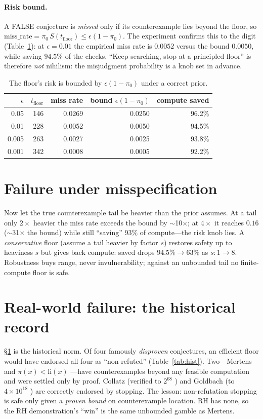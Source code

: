 \documentclass[11pt]{article}
\begin{document}
\paragraph{Risk bound.} A FALSE conjecture is \emph{missed} only if its
counterexample lies beyond the floor, so
$\mathrm{miss\_rate}=\pi_0\,S(t_{\mathrm{floor}})\le\epsilon(1-\pi_0)$. The
experiment confirms this to the digit (Table~\ref{tab:bound}): at $\epsilon=0.01$
the empirical miss rate is $0.0052$ versus the bound $0.0050$, while saving
$94.5\%$ of the checks. ``Keep searching, stop at a principled floor'' is therefore
\emph{not} nihilism: the misjudgment probability is a knob set in advance.

\begin{table}[h]\centering
\begin{tabular}{rrrrr}
\toprule
$\epsilon$ & $t_{\mathrm{floor}}$ & miss rate & bound $\epsilon(1-\pi_0)$ & compute saved\\
\midrule
0.05  & 146 & 0.0269 & 0.0250 & 96.2\%\\
0.01  & 228 & 0.0052 & 0.0050 & 94.5\%\\
0.005 & 263 & 0.0027 & 0.0025 & 93.8\%\\
0.001 & 342 & 0.0008 & 0.0005 & 92.2\%\\
\bottomrule
\end{tabular}
\caption{The floor's risk is bounded by $\epsilon(1-\pi_0)$ under a correct prior.}
\label{tab:bound}
\end{table}

\section{Failure under misspecification}\label{sec:fail}
Now let the true counterexample tail be heavier than the prior assumes. At a tail
only $2\times$ heavier the miss rate exceeds the bound by $\sim$10$\times$; at
$4\times$ it reaches $0.16$ ($\sim$31$\times$ the bound) while still ``saving''
93\% of compute---the risk knob lies. A \emph{conservative} floor (assume a tail
heavier by factor $s$) restores safety up to heaviness $s$ but gives back compute:
saved drops $94.5\%\!\to\!63\%$ as $s:1\!\to\!8$. Robustness buys range, never
invulnerability; against an unbounded tail no finite-compute floor is safe.

\section{Real-world failure: the historical record}\label{sec:history}
\S\ref{sec:fail} is the historical norm. Of four famously \emph{disproven}
conjectures, an efficient floor would have endorsed all four as ``non-refuted''
(Table~\ref{tab:hist}). Two---Mertens \citep{odlyzko1985} and
$\pi(x)<\mathrm{li}(x)$ \citep{littlewood1914}---have counterexamples beyond any
feasible computation and were settled only by proof. Collatz (verified to
$2^{68}$ \citep{barina2020}) and Goldbach (to $4\times10^{18}$
\citep{oliveira2014}) are correctly endorsed by stopping. The lesson:
non-refutation stopping is safe only given a \emph{proven bound} on
counterexample location. RH has none, so the RH demonstration's ``win'' is the
same unbounded gamble as Mertens.
\end{document}
